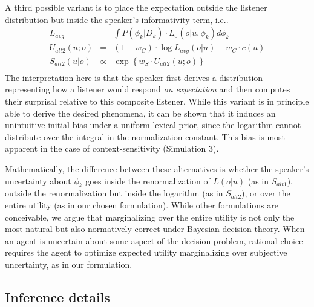 \documentclass[10pt, jou, floatsintext]{apa7}
\begin{document}
A third possible variant is to place the expectation outside the listener distribution but inside the speaker's informativity term, i.e..
$$
\begin{array}{rcl}
L_{avg} & = & \int P(\phi_k | D_k)\cdot L_0(o|u, \phi_k) d\phi_k \\
U_{alt2}(u;o) & = & (1-w_C) \cdot \log L_{avg}(o|u) - w_C \cdot c(u)\\
S_{alt2}(u|o) & \propto & \exp\left\{w_S \cdot U_{alt2}(u;o)\right\} \\
\end{array}
$$
The interpretation here is that the speaker first derives a distribution representing how a listener would respond \emph{on expectation} and then computes their surprisal relative to this composite listener.
While this variant is in principle able to derive the desired phenomena, it can be shown that it induces an unintuitive initial bias under a uniform lexical prior, since the logarithm cannot distribute over the integral in the normalization constant. 
This bias is most apparent in the case of context-sensitivity (Simulation 3).

Mathematically, the difference between these alternatives is whether the speaker's uncertainty about $\phi_k$ goes inside the renormalization of $L(o|u)$ (as in $S_{alt1}$), outside the renormalization but inside the logarithm (as in $S_{alt2}$), or over the entire utility (as in our chosen formulation).
While other formulations are conceivable, we argue that marginalizing over the entire utility is not only the most natural but also normatively correct under Bayesian decision theory. 
When an agent is uncertain about some aspect of the decision problem, rational choice requires the agent to optimize expected utility marginalizing over subjective uncertainty, as in our formulation. 

\subsection{Inference details} 
\end{document}
